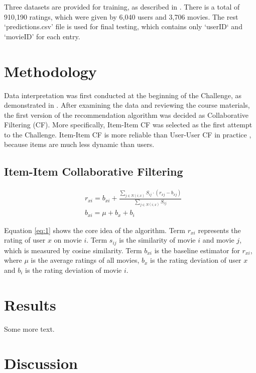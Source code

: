 \documentclass{ece}
\begin{document}
Three datasets are provided for training, as described in .
There is a total of 910,190 ratings, which were given by 6,040 users and 3,706 movies.
The rest `predictions.csv' file is used for final testing, which contains only `userID` and `movieID' for each entry.


\section{Methodology}

Data interpretation was first conducted at the beginning of the Challenge, as demonstrated in .
After examining the data and reviewing the course materials, the first version of the recommendation algorithm was decided as Collaborative Filtering (CF).
More specifically, Item-Item CF was selected as the first attempt to the Challenge.
Item-Item CF is more reliable than User-User CF in practice \cite{mmds}, because items are much less dynamic than users.

\subsection{Item-Item Collaborative Filtering}

\begin{equation}
	\begin{aligned}\label{eq:1}
& r_{xi} = b_{xi} + \frac{\sum\limits_{j\in N(i;x)} S_{ij} \cdot (r_{xj} - b_{xj}) }{\sum\limits_{j\in N(i;x)} S_{ij}}  \\
& b_{xi} = \mu + b_x + b_i
	\end{aligned}
\end{equation}

Equation \eqref{eq:1} shows the core idea of the algorithm.
Term $r_{xi}$ represents the rating of user $x$ on movie $i$.
Term $s_{ij}$ is the similarity of movie $i$ and movie $j$, which is measured by cosine similarity.
Term $b_{xi}$ is the baseline estimator for $r_{xi}$, where $\mu$ is the average ratings of all movies, $b_x$ is the rating deviation of user $x$ and $b_i$ is the rating deviation of movie $i$.

\section{Results}

Some more text.

\section{Discussion}
\end{document}
